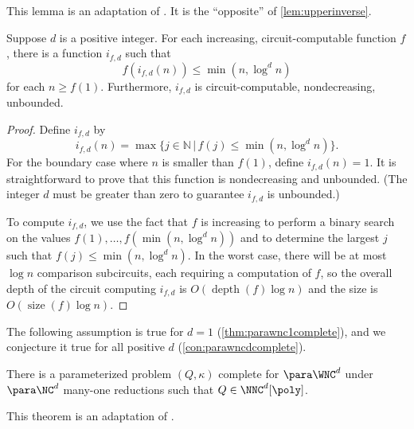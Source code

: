\documentclass{article}
\DeclareMathOperator{\depth}{depth}
\DeclareMathOperator{\size}{size}
\begin{document}
This lemma is an adaptation of \autocite[Lemma~3.24]{fg06}.
It is the ``opposite'' of \autoref{lem:upperinverse}.

\begin{lemma}\label{lem:lowerinverse}
  Suppose $d$ is a positive integer.
  For each increasing, circuit-computable function $f$, there is a function $i_{f, d}$ such that
  \[
  f(i_{f, d}(n)) \leq \min(n, \log^d n)
  \]
  for each $n \geq f(1)$.
  Furthermore, $i_{f, d}$ is circuit-computable, nondecreasing, unbounded.
\end{lemma}
\begin{proof}
  Define $i_{f, d}$ by
  \[
  i_{f, d}(n) = \max\{ j \in \mathbb{N} \, | \, f(j) \leq \min(n, \log^d n) \}.
  \]
  For the boundary case where $n$ is smaller than $f(1)$, define $i_{f, d}(n) = 1$.
  It is straightforward to prove that this function is nondecreasing and unbounded.
  (The integer $d$ must be greater than zero to guarantee $i_{f, d}$ is unbounded.)

  To compute $i_{f, d}$, we use the fact that $f$ is increasing to perform a binary search on the values $f(1), \dotsc, f(\min(n, \log^d n))$ and to determine the largest $j$ such that $f(j) \leq \min(n, \log^d n)$.
  In the worst case, there will be at most $\log n$ comparison subcircuits, each requiring a computation of $f$, so the overall depth of the circuit computing $i_{f, d}$ is $O(\depth(f) \log n)$ and the size is $O(\size(f) \log n)$.
\end{proof}

The following assumption is true for $d = 1$ (\autoref{thm:parawnc1complete}), and we conjecture it true for all positive $d$ (\autoref{con:parawncdcomplete}).

\begin{assumption}\label{ass:complete}
  There is a parameterized problem $(Q, \kappa)$ complete for $\para \WNC^d$ under $\para \NC^d$ many-one reductions such that $Q \in \NNC^d[\poly]$.
\end{assumption}

This theorem is an adaptation of \autocite[Theorem~3.29]{fg06}.
\end{document}
